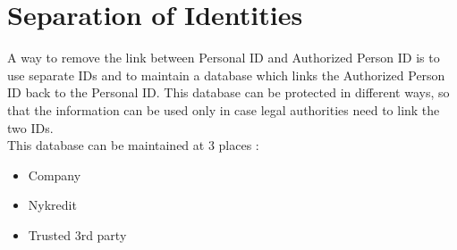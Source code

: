 \section{Separation of Identities}
A way to remove the link between Personal ID and Authorized Person ID is to use separate IDs and to maintain a database which links the Authorized Person ID back to the Personal ID. This database can be protected in different ways, so that the information can be used only in case legal authorities need to link the two IDs.
\\This database can be maintained at 3 places :
\begin{itemize}
	\item Company 
	\item Nykredit
	\item Trusted 3rd party
\end{itemize}
